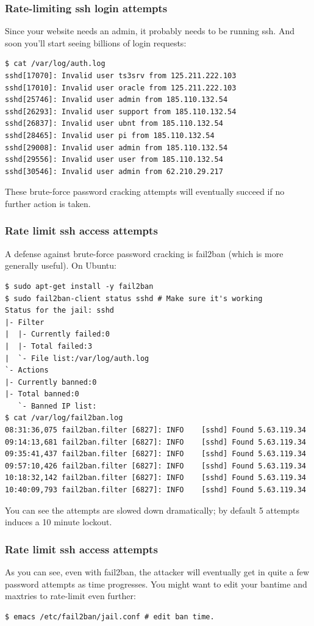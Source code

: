 \documentclass[9pt]{beamer}
\begin{document}
\begin{frame}[fragile]
\frametitle{Rate-limiting ssh login attempts}
Since your website needs an admin, it probably needs to be running ssh. And soon you'll start seeing billions of login requests:
\begin{verbatim}
$ cat /var/log/auth.log
sshd[17070]: Invalid user ts3srv from 125.211.222.103
sshd[17010]: Invalid user oracle from 125.211.222.103
sshd[25746]: Invalid user admin from 185.110.132.54
sshd[26293]: Invalid user support from 185.110.132.54
sshd[26837]: Invalid user ubnt from 185.110.132.54
sshd[28465]: Invalid user pi from 185.110.132.54
sshd[29008]: Invalid user admin from 185.110.132.54
sshd[29556]: Invalid user user from 185.110.132.54
sshd[30546]: Invalid user admin from 62.210.29.217
\end{verbatim}
These brute-force password cracking attempts will eventually succeed if no further action is taken.
\end{frame}

\begin{frame}[fragile]
\frametitle{Rate limit ssh access attempts}
A defense against brute-force password cracking is fail2ban (which is more generally useful).
On Ubuntu:
\begin{verbatim}
$ sudo apt-get install -y fail2ban  
$ sudo fail2ban-client status sshd # Make sure it's working
Status for the jail: sshd
|- Filter
|  |- Currently failed:0
|  |- Total failed:3
|  `- File list:/var/log/auth.log
`- Actions
|- Currently banned:0
|- Total banned:0
   `- Banned IP list:
$ cat /var/log/fail2ban.log 
08:31:36,075 fail2ban.filter [6827]: INFO    [sshd] Found 5.63.119.34
09:14:13,681 fail2ban.filter [6827]: INFO    [sshd] Found 5.63.119.34
09:35:41,437 fail2ban.filter [6827]: INFO    [sshd] Found 5.63.119.34
09:57:10,426 fail2ban.filter [6827]: INFO    [sshd] Found 5.63.119.34
10:18:32,142 fail2ban.filter [6827]: INFO    [sshd] Found 5.63.119.34
10:40:09,793 fail2ban.filter [6827]: INFO    [sshd] Found 5.63.119.34
\end{verbatim}
You can see the attempts are slowed down dramatically; by default 5 attempts induces a 10 minute lockout.
\end{frame}

\begin{frame}[fragile]
\frametitle{Rate limit ssh access attempts}
As you can see, even with fail2ban, the attacker will eventually get in quite a few password attempts as time progresses. You might want to edit your bantime and maxtries to rate-limit even further:
\begin{verbatim}
$ emacs /etc/fail2ban/jail.conf # edit ban time.
\end{verbatim}
\end{frame}
\end{document}
